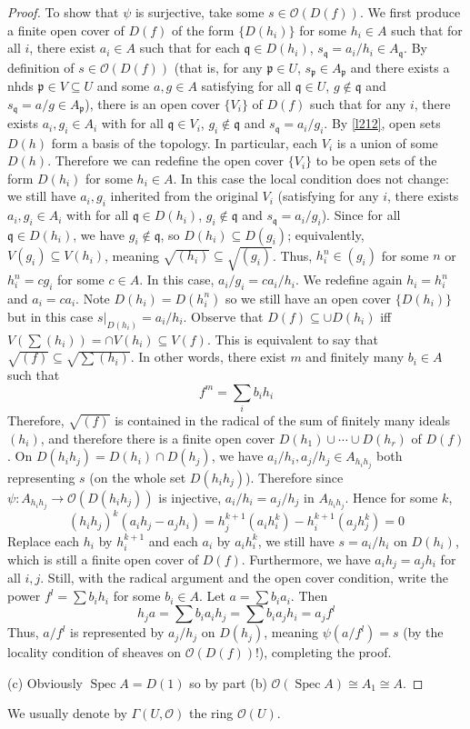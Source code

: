 \documentclass[12pt,letter]{article}
\newcommand{\Spec}[0]{\operatorname{Spec}}
\begin{document}
\begin{proof}
	To show that $\psi$ is surjective, take some $s\in \mathscr O(D(f))$. We first produce a finite open cover of $D(f)$ of the form $\{D(h_i)\}$ for some $h_i\in A$ such that for all $i$, there exist $a_i\in A$ such that for each $\mathfrak q\in D(h_i)$, $s_{\mathfrak q}=a_i/h_i\in A_{\mathfrak q}$. By definition of $s\in \mathscr O(D(f))$ (that is, for any $\mathfrak p\in U$, $s_{\mathfrak p}\in A_{\mathfrak p}$ and there exists a nhds $\mathfrak p\in V\subseteq U$ and some $a, g\in A$ satisfying for all $\mathfrak q\in U$, $g\notin \mathfrak q$ and $s_{\mathfrak q}= a/g\in A_{\mathfrak p}$), there is an open cover $\{V_i\}$ of $D(f)$ such that for any $i$, there exists $a_i, g_i\in A_i$ with for all $\mathfrak q\in V_i$, $g_i\notin \mathfrak q$ and $s_{\mathfrak q}=a_i/g_i$. By \autoref{l212}, open sets $D(h)$ form a basis of the topology. In particular, each $V_i$ is a union of some $D(h)$. Therefore we can redefine the open cover $\{V_i\}$ to be open sets of the form $D(h_i)$ for some $h_i\in A$. In this case the local condition does not change: we still have $a_i, g_i$ inherited from the original $V_i$ (satisfying for any $i$, there exists $a_i, g_i\in A_i$ with for all $\mathfrak q\in D(h_i)$, $g_i\notin \mathfrak q$ and $s_{\mathfrak q}=a_i/g_i$). Since for all $\mathfrak q\in D(h_i)$, we have $g_i\notin \mathfrak q$, so $D(h_i)\subseteq D(g_i)$; equivalently, $V(g_i)\subseteq V(h_i)$, meaning $\sqrt{(h_i)}\subseteq\sqrt{(g_i)}$. Thus, $h_i^n\in (g_i)$ for some $n$ or $h_i^n=cg_i$ for some $c\in A$. In this case, $a_i/g_i=ca_i/h_i$. We redefine again $h_i=h_i^n$ and $a_i=ca_i$. Note $D(h_i)=D(h_i^n)$ so we still have an open cover $\{D(h_i)\}$ but in this case $s|_{D(h_i)}=a_i/h_i$. Observe that $D(f)\subseteq \cup D(h_i)$ iff $V(\sum (h_i))=\cap V(h_i)\subseteq V(f)$. This is equivalent to say that $\sqrt{(f)}\subseteq \sqrt{\sum (h_i)}$. In other words, there exist $m$ and finitely many $b_i\in A$ such that
	\[f^m=\sum_i b_ih_i\]
	Therefore, $\sqrt{(f)}$ is contained in the radical of the sum of finitely many ideals $(h_i)$, and therefore there is a finite open cover $D(h_1)\cup\cdots\cup D(h_r)$ of $D(f)$. On $D(h_ih_j)=D(h_i)\cap D(h_j)$, we have $a_i/h_i, a_j/h_j\in A_{h_ih_j}$ both representing $s$ (on the whole set $D(h_ih_j)$). Therefore since $\psi: A_{h_ih_j}\to \mathscr O(D(h_ih_j))$ is injective, $a_i/h_i=a_j/h_j$ in $A_{h_ih_j}$. Hence for some $k$,
	\[(h_ih_j)^k(a_ih_j-a_jh_i)=h_j^{k+1}(a_ih_i^k)-h_i^{k+1}(a_jh_j^k)=0\]
	Replace each $h_i$ by $h_i^{k+1}$ and each $a_i$ by $a_ih_i^k$, we still have $s=a_i/h_i$ on $D(h_i)$, which is still a finite open cover of $D(f)$. Furthermore, we have $a_ih_j=a_jh_i$ for all $i, j$. Still, with the radical argument and the open cover condition, write the power $f^l=\sum b_ih_i$ for some $b_i\in A$. Let $a=\sum b_ia_i$. Then
	\[h_ja=\sum b_ia_ih_j=\sum b_ia_jh_i=a_jf^l\]
	Thus, $a/f^l$ is represented by $a_j/h_j$ on $D(h_j)$, meaning $\psi(a/f^l)=s$ (by the locality condition of sheaves on $\mathscr O(D(f))$!), completing the proof.
	
	(c) Obviously $\Spec A=D(1)$ so by part (b) $\mathscr O(\Spec A)\cong A_1\cong A$.
	\end{proof}
	We usually denote by $\Gamma(U, \mathscr O)$ the ring $\mathscr O(U)$.
\end{document}
